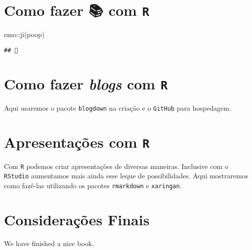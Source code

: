 \documentclass[
  12pt,
  brazilian,
]{book}
\newenvironment{Shaded}{\begin{snugshade}}{\end{snugshade}}
\newcommand{\FunctionTok}[1]{\textcolor[rgb]{0.00,0.00,0.00}{#1}}
\newcommand{\NormalTok}[1]{#1}
\newcommand{\SpecialCharTok}[1]{\textcolor[rgb]{0.00,0.00,0.00}{#1}}
\newcommand{\StringTok}[1]{\textcolor[rgb]{0.31,0.60,0.02}{#1}}
\begin{document}
\hypertarget{como-fazer-com-r}{%
\chapter{\texorpdfstring{Como fazer 📚 com \texttt{R}}{Como fazer 📚 com R}}\label{como-fazer-com-r}}

\begin{Shaded}
\begin{Highlighting}[]
\NormalTok{emo}\SpecialCharTok{::}\FunctionTok{ji}\NormalTok{(}\StringTok{\textquotesingle{}poop\textquotesingle{}}\NormalTok{)}
\end{Highlighting}
\end{Shaded}

\begin{verbatim}
## 💩
\end{verbatim}

\hypertarget{como-fazer-blogs-com-r}{%
\chapter{\texorpdfstring{Como fazer \emph{blogs} com \texttt{R}}{Como fazer blogs com R}}\label{como-fazer-blogs-com-r}}

Aqui usaremos o pacote \texttt{blogdown} na criação e o \texttt{GitHub} para hospedagem.

\hypertarget{apresentauxe7uxf5es-com-r}{%
\chapter{\texorpdfstring{Apresentações com \texttt{R}}{Apresentações com R}}\label{apresentauxe7uxf5es-com-r}}

Com \texttt{R} podemos criar apresentações de diversas maneiras. Inclusive com o \texttt{RStudio} aumentamos mais ainda esse leque de possibilidades. Aqui mostraremos como fazê-las utilizando os pacotes \texttt{rmarkdown} e \texttt{xaringan}.

\hypertarget{considerauxe7uxf5es-finais}{%
\chapter{Considerações Finais}\label{considerauxe7uxf5es-finais}}

We have finished a nice book.

\renewcommand{\bibname}{Referências}

\hypertarget{appendix-apuxeandice}{%
\appendix}
\end{document}
